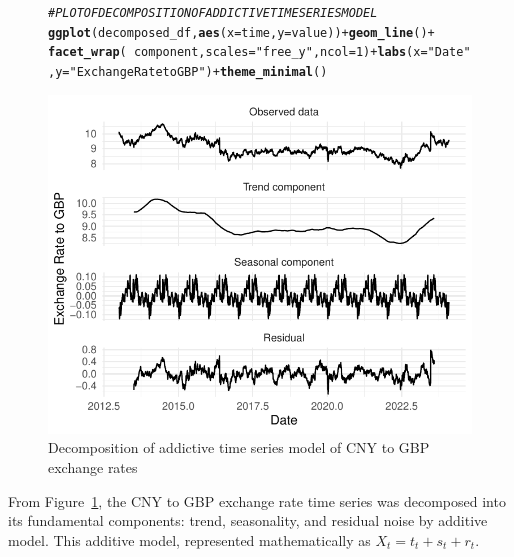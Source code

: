 \documentclass{article}\usepackage[]{graphicx}\usepackage[]{xcolor}
\makeatletter
\def\maxwidth{ %
  \ifdim\Gin@nat@width>\linewidth
    \linewidth
  \else
    \Gin@nat@width
  \fi
}
\newcommand{\hlnum}[1]{\textcolor[rgb]{0.686,0.059,0.569}{#1}}%
\newcommand{\hlstr}[1]{\textcolor[rgb]{0.192,0.494,0.8}{#1}}%
\newcommand{\hlcom}[1]{\textcolor[rgb]{0.678,0.584,0.686}{\textit{#1}}}%
\newcommand{\hlopt}[1]{\textcolor[rgb]{0,0,0}{#1}}%
\newcommand{\hlstd}[1]{\textcolor[rgb]{0.345,0.345,0.345}{#1}}%
\newcommand{\hlkwc}[1]{\textcolor[rgb]{0.333,0.667,0.333}{#1}}%
\newcommand{\hlkwd}[1]{\textcolor[rgb]{0.737,0.353,0.396}{\textbf{#1}}}%
\newenvironment{kframe}{%
 \def\at@end@of@kframe{}%
 \ifinner\ifhmode%
  \def\at@end@of@kframe{\end{minipage}}%
  \begin{minipage}{\columnwidth}%
 \fi\fi%
 \def\FrameCommand##1{\hskip\@totalleftmargin \hskip-\fboxsep
 \colorbox{shadecolor}{##1}\hskip-\fboxsep
     \hskip-\linewidth \hskip-\@totalleftmargin \hskip\columnwidth}%
 \MakeFramed {\advance\hsize-\width
   \@totalleftmargin\z@ \linewidth\hsize
   \@setminipage}}%
 {\par\unskip\endMakeFramed%
 \at@end@of@kframe}
\newenvironment{knitrout}{}{} %
\numberwithin{equation}{section}
\makeatother
\begin{document}
\begin{figure}[H]
\begin{knitrout}\scriptsize
{}\color{fgcolor}\begin{kframe}
\begin{alltt}
\hlcom{# PLOT OF DECOMPOSITION OF ADDICTIVE TIME SERIES MODEL}
\hlkwd{ggplot}\hlstd{(decomposed_df,} \hlkwd{aes}\hlstd{(}\hlkwc{x} \hlstd{= time,} \hlkwc{y} \hlstd{= value))} \hlopt{+} \hlkwd{geom_line}\hlstd{()} \hlopt{+}
  \hlkwd{facet_wrap}\hlstd{(}\hlopt{~}\hlstd{component,} \hlkwc{scales} \hlstd{=} \hlstr{"free_y"}\hlstd{,} \hlkwc{ncol} \hlstd{=} \hlnum{1}\hlstd{)} \hlopt{+} \hlkwd{labs}\hlstd{(}\hlkwc{x} \hlstd{=} \hlstr{"Date"}\hlstd{,}\hlkwc{y} \hlstd{=} \hlstr{"Exchange Rate to GBP"}\hlstd{)} \hlopt{+} \hlkwd{theme_minimal}\hlstd{()}
\end{alltt}
\end{kframe}

{\centering \includegraphics[width=\maxwidth]{figure/beamer-unnamed-chunk-4-1} 

}


\end{knitrout}
\centering
\caption{Decomposition of addictive time series model of CNY to GBP exchange rates}
\label{fig:decomposition of time series}
\end{figure}

\noindent
From Figure~\ref{fig:decomposition of time series}, the CNY to GBP exchange rate time series was decomposed into its fundamental components: trend, seasonality, and residual noise by additive model. This additive model, represented mathematically as $X_t = t_t + s_t + r_t$.\\
\end{document}
